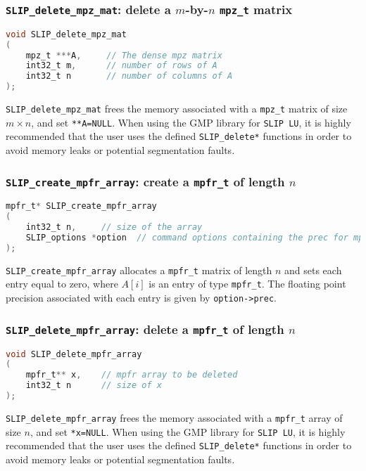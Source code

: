 \documentclass[12pt]{article}
\theoremstyle{definition}
\begin{document}
\cprotect\subsubsection{\verb|SLIP_delete_mpz_mat|: delete a $m$-by-$n$ \verb|mpz_t| matrix}


\begin{lstlisting}[language=C,frame=single]
void SLIP_delete_mpz_mat
(
    mpz_t ***A,     // The dense mpz matrix
    int32_t m,      // number of rows of A
    int32_t n       // number of columns of A
);
\end{lstlisting}

\verb|SLIP_delete_mpz_mat| frees the memory associated with a \verb|mpz_t| matrix of size $m \times n$, and set \verb|**A=NULL|. When using the GMP library for \verb|SLIP LU|, it is highly recommended that the user uses the defined \verb|SLIP_delete*| functions in order to avoid memory leaks or potential segmentation faults.

\cprotect\subsubsection{\verb|SLIP_create_mpfr_array|: create a \verb|mpfr_t| of length $n$}


\begin{lstlisting}[language=C,frame=single]
mpfr_t* SLIP_create_mpfr_array
(
    int32_t n,     // size of the array
    SLIP_options *option  // command options containing the prec for mpfr
);
\end{lstlisting}

\verb|SLIP_create_mpfr_array| allocates a \verb|mpfr_t| matrix of length $n$ and sets each entry equal to zero, where  $A[i]$ is an entry of type \verb|mpfr_t|. The floating point precision associated with each entry is given by \verb|option->prec|.

\cprotect\subsubsection{\verb|SLIP_delete_mpfr_array|: delete a \verb|mpfr_t| of length $n$}


\begin{lstlisting}[language=C,frame=single]
void SLIP_delete_mpfr_array
(
    mpfr_t** x,    // mpfr array to be deleted
    int32_t n      // size of x
);
\end{lstlisting}

\verb|SLIP_delete_mpfr_array| frees the memory associated with a \verb|mpfr_t| array of size $n$, and set \verb|*x=NULL|. When using the GMP library for \verb|SLIP LU|, it is highly recommended that the user uses the defined \verb|SLIP_delete*| functions in order to avoid memory leaks or potential segmentation faults.
\end{document}
